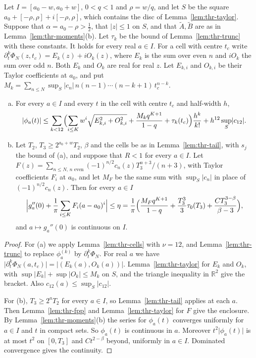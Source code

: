 Let $I=[a_0-w,a_0+w]$, $0<q<1$ and $\rho=w/q$, and let $S$ be the square
$a_0+[-\rho,\rho]+i[-\rho,\rho]$, which contains the disc of
Lemma~\ref{lem:thr-taylor}. Suppose that $\alpha=a_0-\rho>\frac12$, that
$\lvert z\rvert\le1$ on $S$, and that $\tilde A,\tilde B$ are as in
Lemma~\ref{lem:thr-moments}(b). Let $\tau_k$ be the bound of
Lemma~\ref{lem:thr-trunc} with these constants. It holds for every real
$a\in I$. For a cell with centre $t_c$ write
$\partial_t^k\Phi_N(z,t_c)=E_k(z)+iO_k(z)$, where $E_k$ is the sum over even
$n$ and $iO_k$ the sum over odd $n$. Both $E_k$ and $O_k$ are real for real
$z$. Let $E_{k,i}$ and $O_{k,i}$ be their Taylor coefficients at $a_0$, and
put $M_k=\sum_{n\le N}\sup_S\lvert c_n\rvert\,n(n-1)\cdots(n-k+1)\,t_c^{n-k}$.

\begin{proposition}\label{prop:thr-interval}
\begin{enumerate}[(a)]
\item For every $a\in I$ and every $t$ in the cell with centre $t_c$ and
half-width $h$,
\[
 \lvert\phi_a(t)\rvert\le\sum_{k<12}\Bigl(\sum_{i\le K}w^i
 \sqrt{E_{k,i}^2+O_{k,i}^2}+\frac{M_kq^{K+1}}{1-q}+\tau_k(t_c)\Bigr)
 \frac{h^k}{k!}+h^{12}\sup_S\lvert c_{12}\rvert .
\]
\item Let $T_2$, $T_3\ge2^{a_0+w}T_2$, $\beta$ and the cells be as in
Lemma~\ref{lem:thr-tail}, with $s_j$ the bound of (a), and suppose that $R<1$
for every $a\in I$. Let $F(z)=\sum_{n\le N,\,n\text{ even}}(-1)^{n/2}c_n(z)
T_3^{n+3}/(n+3)$, with Taylor coefficients $F_i$ at $a_0$, and let $M_F$ be
the same sum with $\sup_S\lvert c_n\rvert$ in place of $(-1)^{n/2}c_n(z)$. Then
for every $a\in I$
\[
 \Bigl\lvert g_a''(0)+\frac1\pi\sum_{i\le K}F_i(a-a_0)^i\Bigr\rvert\le\eta
 =\frac1\pi\Bigl(\frac{M_Fq^{K+1}}{1-q}+\frac{T_3^3}3\tau_0(T_3)
 +\frac{CT_3^{3-\beta}}{\beta-3}\Bigr),
\]
and $a\mapsto g_a''(0)$ is continuous on $I$.
\end{enumerate}
\end{proposition}

\begin{proof}
For (a) we apply Lemma~\ref{lem:thr-cells} with $\nu=12$, and
Lemma~\ref{lem:thr-trunc} to replace $\phi_a^{(k)}$ by $\partial_t^k\Phi_N$.
For real $a$ we have
$\lvert\partial_t^k\Phi_N(a,t_c)\rvert=\lvert(E_k(a),O_k(a))\rvert$.
Lemma~\ref{lem:thr-taylor} for $E_k$ and $O_k$, with
$\sup\lvert E_k\rvert+\sup\lvert O_k\rvert\le M_k$ on $S$, and the triangle
inequality in $\mathbb R^2$ give the bracket. Also
$c_{12}(a)\le\sup_S\lvert c_{12}\rvert$.

For (b), $T_3\ge2^aT_2$ for every $a\in I$, so Lemma~\ref{lem:thr-tail} applies
at each $a$. Then Lemma~\ref{lem:thr-fpp} and Lemma~\ref{lem:thr-taylor} for
$F$ give the enclosure. By Lemma~\ref{lem:thr-moments}(b) the series for
$\phi_a(t)$ converges uniformly for $a\in I$ and $t$ in compact sets. So
$\phi_a(t)$ is continuous in $a$. Moreover $t^2\lvert\phi_a(t)\rvert$ is at
most $t^2$ on $[0,T_3]$ and $Ct^{2-\beta}$ beyond, uniformly in $a\in I$.
Dominated convergence gives the continuity.
\end{proof}

